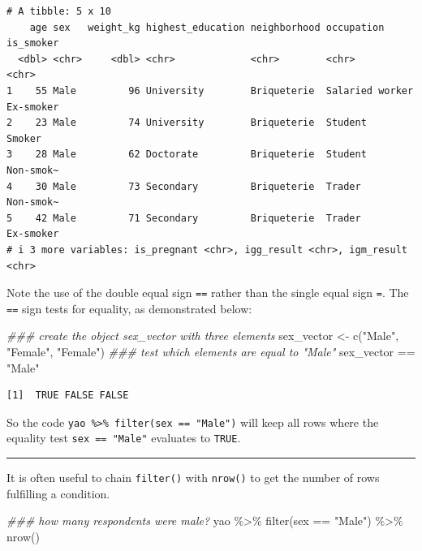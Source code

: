 \documentclass[
  letterpaper,
  DIV=11,
  numbers=noendperiod]{scrreprt}
\newenvironment{Shaded}{\begin{snugshade}}{\end{snugshade}}
\newcommand{\DocumentationTok}[1]{\textcolor[rgb]{0.37,0.37,0.37}{\textit{#1}}}
\newcommand{\FunctionTok}[1]{\textcolor[rgb]{0.28,0.35,0.67}{#1}}
\newcommand{\NormalTok}[1]{\textcolor[rgb]{0.00,0.23,0.31}{#1}}
\newcommand{\OtherTok}[1]{\textcolor[rgb]{0.00,0.23,0.31}{#1}}
\newcommand{\SpecialCharTok}[1]{\textcolor[rgb]{0.37,0.37,0.37}{#1}}
\newcommand{\StringTok}[1]{\textcolor[rgb]{0.13,0.47,0.30}{#1}}
\begin{document}
\begin{verbatim}
# A tibble: 5 x 10
    age sex   weight_kg highest_education neighborhood occupation      is_smoker
  <dbl> <chr>     <dbl> <chr>             <chr>        <chr>           <chr>    
1    55 Male         96 University        Briqueterie  Salaried worker Ex-smoker
2    23 Male         74 University        Briqueterie  Student         Smoker   
3    28 Male         62 Doctorate         Briqueterie  Student         Non-smok~
4    30 Male         73 Secondary         Briqueterie  Trader          Non-smok~
5    42 Male         71 Secondary         Briqueterie  Trader          Ex-smoker
# i 3 more variables: is_pregnant <chr>, igg_result <chr>, igm_result <chr>
\end{verbatim}

Note the use of the double equal sign \texttt{==} rather than the single
equal sign \texttt{=}. The \texttt{==} sign tests for equality, as
demonstrated below:

\begin{Shaded}
\begin{Highlighting}[]
\DocumentationTok{\#\#\# create the object \textasciigrave{}sex\_vector\textasciigrave{} with three elements}
\NormalTok{sex\_vector }\OtherTok{\textless{}{-}} \FunctionTok{c}\NormalTok{(}\StringTok{"Male"}\NormalTok{, }\StringTok{"Female"}\NormalTok{, }\StringTok{"Female"}\NormalTok{)}
\DocumentationTok{\#\#\# test which elements are equal to "Male"}
\NormalTok{sex\_vector }\SpecialCharTok{==} \StringTok{"Male"}
\end{Highlighting}
\end{Shaded}

\begin{verbatim}
[1]  TRUE FALSE FALSE
\end{verbatim}

So the code \texttt{yao\ \%\textgreater{}\%\ filter(sex\ ==\ "Male")}
will keep all rows where the equality test \texttt{sex\ ==\ "Male"}
evaluates to \texttt{TRUE}.

\begin{center}\rule{0.5\linewidth}{0.5pt}\end{center}

It is often useful to chain \texttt{filter()} with \texttt{nrow()} to
get the number of rows fulfilling a condition.

\begin{Shaded}
\begin{Highlighting}[]
\DocumentationTok{\#\#\# how many respondents were male?}
\NormalTok{yao }\SpecialCharTok{\%\textgreater{}\%} 
  \FunctionTok{filter}\NormalTok{(sex }\SpecialCharTok{==} \StringTok{"Male"}\NormalTok{) }\SpecialCharTok{\%\textgreater{}\%} 
  \FunctionTok{nrow}\NormalTok{()}
\end{Highlighting}
\end{Shaded}
\end{document}
